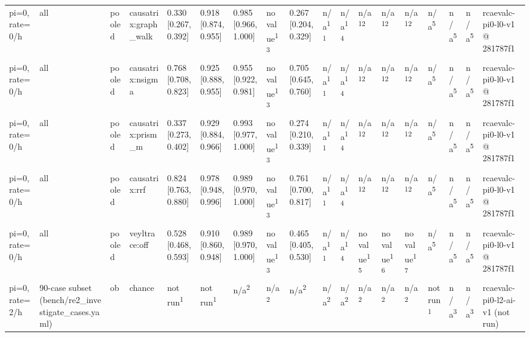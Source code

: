 \begin{table}[t]
\begin{tabular}{llllllllllllllllll}
pi=0, rate=0/h & all & pooled & causatrix:graph\_walk & 0.330 [0.267, 0.392] & 0.918 [0.874, 0.955] & 0.985 [0.966, 1.000] & no value\textsuperscript{13} & 0.267 [0.204, 0.329] & n/a\textsuperscript{11} & n/a\textsuperscript{14} & n/a\textsuperscript{12} & n/a\textsuperscript{12} & n/a\textsuperscript{12} & n/a\textsuperscript{5} & n/a\textsuperscript{5} & n/a\textsuperscript{5} & rcaevalc-pi0-l0-v1 @ 281787f1 \\
pi=0, rate=0/h & all & pooled & causatrix:nsigma & 0.768 [0.708, 0.823] & 0.925 [0.888, 0.955] & 0.955 [0.922, 0.981] & no value\textsuperscript{13} & 0.705 [0.645, 0.760] & n/a\textsuperscript{11} & n/a\textsuperscript{14} & n/a\textsuperscript{12} & n/a\textsuperscript{12} & n/a\textsuperscript{12} & n/a\textsuperscript{5} & n/a\textsuperscript{5} & n/a\textsuperscript{5} & rcaevalc-pi0-l0-v1 @ 281787f1 \\
pi=0, rate=0/h & all & pooled & causatrix:prism\_m & 0.337 [0.273, 0.402] & 0.929 [0.884, 0.966] & 0.993 [0.977, 1.000] & no value\textsuperscript{13} & 0.274 [0.210, 0.339] & n/a\textsuperscript{11} & n/a\textsuperscript{14} & n/a\textsuperscript{12} & n/a\textsuperscript{12} & n/a\textsuperscript{12} & n/a\textsuperscript{5} & n/a\textsuperscript{5} & n/a\textsuperscript{5} & rcaevalc-pi0-l0-v1 @ 281787f1 \\
pi=0, rate=0/h & all & pooled & causatrix:rrf & 0.824 [0.763, 0.880] & 0.978 [0.948, 0.996] & 0.989 [0.970, 1.000] & no value\textsuperscript{13} & 0.761 [0.700, 0.817] & n/a\textsuperscript{11} & n/a\textsuperscript{14} & n/a\textsuperscript{12} & n/a\textsuperscript{12} & n/a\textsuperscript{12} & n/a\textsuperscript{5} & n/a\textsuperscript{5} & n/a\textsuperscript{5} & rcaevalc-pi0-l0-v1 @ 281787f1 \\
pi=0, rate=0/h & all & pooled & veyltrace:off & 0.528 [0.468, 0.593] & 0.910 [0.860, 0.948] & 0.989 [0.970, 1.000] & no value\textsuperscript{13} & 0.465 [0.405, 0.530] & n/a\textsuperscript{11} & n/a\textsuperscript{14} & no value\textsuperscript{15} & no value\textsuperscript{16} & no value\textsuperscript{17} & n/a\textsuperscript{5} & n/a\textsuperscript{5} & n/a\textsuperscript{5} & rcaevalc-pi0-l0-v1 @ 281787f1 \\
pi=0, rate=2/h & 90-case subset (bench/re2\_investigate\_cases.yaml) & ob & chance & not run\textsuperscript{1} & not run\textsuperscript{1} & n/a\textsuperscript{2} & n/a\textsuperscript{2} & n/a\textsuperscript{2} & n/a\textsuperscript{2} & n/a\textsuperscript{2} & n/a\textsuperscript{2} & n/a\textsuperscript{2} & n/a\textsuperscript{2} & not run\textsuperscript{1} & n/a\textsuperscript{3} & n/a\textsuperscript{3} & rcaevalc-pi0-l2-ai-v1 (not run) \\

\end{tabular}
\end{table}
